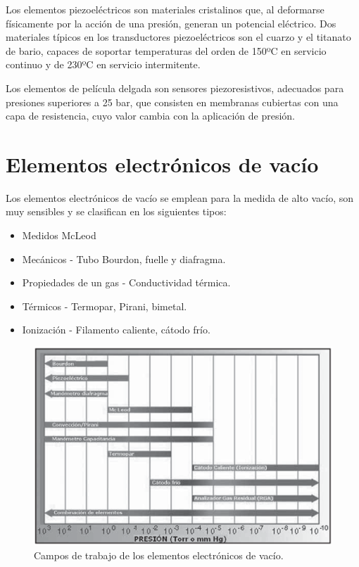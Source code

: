 Los elementos piezoeléctricos son materiales cristalinos que, al deformarse físicamente por la acción de una presión, generan un potencial eléctrico. Dos materiales típicos en los transductores piezoeléctricos son el cuarzo y el titanato de bario, capaces de soportar temperaturas del orden de 150ºC en servicio continuo y de 230ºC en servicio intermitente.

Los elementos de película delgada son sensores piezoresistivos, adecuados para presiones superiores a 25 bar, que consisten en membranas cubiertas con una capa de resistencia, cuyo valor cambia con la aplicación de presión.

\section{Elementos electrónicos de vacío}
Los elementos electrónicos de vacío se emplean para la medida de alto vacío, son muy sensibles y se clasifican en los siguientes tipos:
\begin{itemize}
    \item Medidos McLeod
    \item Mecánicos - Tubo Bourdon, fuelle y diafragma.
    \item Propiedades de un gas - Conductividad térmica.
    \item Térmicos - Termopar, Pirani, bimetal.
    \item Ionización - Filamento caliente, cátodo frío.
\end{itemize}

\begin{figure}[H]
    \centering
    \includegraphics[width=0.5\linewidth]{Imagenes/Presion2.png}
    \caption{Campos de trabajo de los elementos electrónicos de vacío.}
\end{figure}